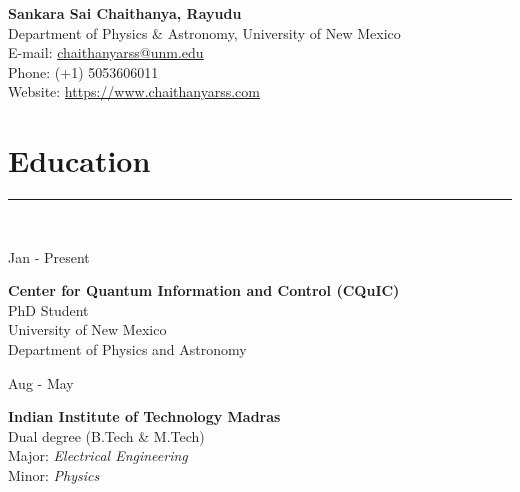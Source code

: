 \documentclass[10pt]{article}
\newcommand\vtick{\textquotesingle}
\begin{document}
\begin{center}
    {\bf\Large Sankara Sai Chaithanya, Rayudu} \\
    Department of Physics \& Astronomy, University of New Mexico \\
    E-mail: \href{mailto:chaithanyarss@unm.edu}{chaithanyarss@unm.edu} \\
    Phone: (+1) 5053606011 \\
    Website: \href{https://www.chaithanyarss.com}{https://www.chaithanyarss.com}
\end{center}
\section*{\color{black} Education}
\noindent\textcolor{black}{\rule{\textwidth}{1.5pt}} \vspace{-0.2cm}\\
\begin{minipage}[t]{.2\textwidth}
Jan\vtick21 - Present
\end{minipage}
\begin{minipage}[t]{.55\textwidth}
{\bf Center for Quantum Information and Control (CQuIC)}\\
PhD Student\\
University of New Mexico\\
Department of Physics and Astronomy\\
\end{minipage}
\begin{minipage}[t]{.28\textwidth}
\end{minipage}

\noindent
\begin{minipage}[t]{.2\textwidth}
Aug\vtick14 - May\vtick19
\end{minipage}
\begin{minipage}[t]{.55\textwidth}
{\bf Indian Institute of Technology Madras} \\
Dual degree (B.Tech \& M.Tech) \\
Major: {\it Electrical Engineering} \\
Minor: {\it Physics} \\
\end{minipage}
\begin{minipage}[t]{.28\textwidth}
\end{minipage}
\end{document}
